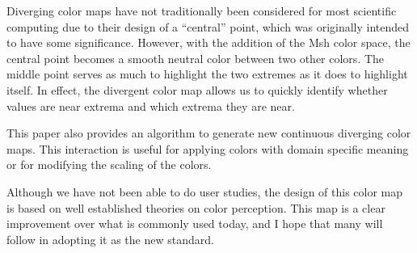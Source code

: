 \documentclass[review,journal]{vgtc}         %
\newcommand{\Msh}{Msh\xspace}
\begin{document}
Diverging color maps have not traditionally been considered for most
scientific computing due to their design of a ``central'' point, which was
originally intended to have some significance.  However, with the addition
of the \Msh color space, the central point becomes a smooth neutral color
between two other colors.  The middle point serves as much to highlight the
two extremes as it does to highlight itself.  In effect, the divergent
color map allows us to quickly identify whether values are near extrema and
which extrema they are near.

This paper also provides an algorithm to generate new continuous diverging
color maps.  This interaction is useful for applying colors with domain
specific meaning or for modifying the scaling of the colors.

Although we have not been able to do user studies, the design of this color
map is based on well established theories on color perception.  This map is
a clear improvement over what is commonly used today, and I hope that many
will follow in adopting it as the new standard.






\end{document}
